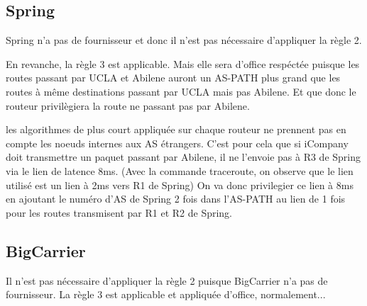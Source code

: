\documentclass[a4paper, 12pt]{report}
\begin{document}
\subsection{Spring}
Spring n'a pas de fournisseur et donc il n'est pas nécessaire d'appliquer la règle 2.

En revanche, la règle 3 est applicable.
Mais elle sera d'office respéctée puisque les routes passant par UCLA et Abilene auront un AS-PATH plus grand que les routes à même destinations passant par UCLA mais pas Abilene.
Et que donc le routeur privilègiera la route ne passant pas par Abilene.

les algorithmes de plus court appliquée sur chaque routeur ne prennent pas en compte les noeuds internes aux AS étrangers.
C'est pour cela que si iCompany doit transmettre un paquet passant par Abilene, il ne l'envoie pas à R3 de Spring via le lien de latence 8ms.
(Avec la commande traceroute, on observe que le lien utilisé est un lien à 2ms vers R1 de Spring)
On va donc privilegier ce lien à 8ms en ajoutant le numéro d'AS de Spring 2 fois dans l'AS-PATH au lien de 1 fois pour les routes transmisent par R1 et R2 de Spring.

\subsection{BigCarrier}
Il n'est pas nécessaire d'appliquer la règle 2 puisque BigCarrier n'a pas de fournisseur.
La règle 3 est applicable et appliquée d'office, normalement...
\end{document}
